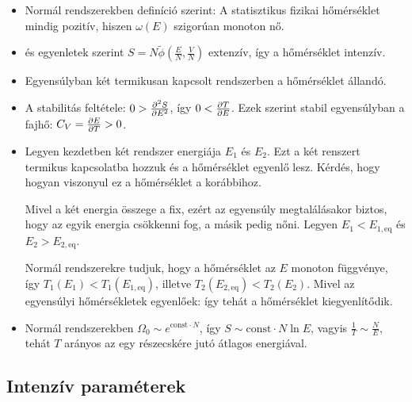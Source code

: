    \begin{itemize}
    \item 
     Normál rendszerekben definíció szerint:
     A statisztikus fizikai hőmérséklet mindig pozitív, hiszen $\omega(E)$ szigorúan monoton nő. 
    
    \item
      és  egyenletek szerint $S=N\tilde{\phi}\left(\frac{E}{N},\frac{V}{N}\right)$ extenzív, így 
     a hőmérséklet intenzív. 
     
    \item
     Egyensúlyban két termikusan kapcsolt rendszerben a hőmérséklet állandó.
    \item 
     A stabilitás feltétele: $0>\frac{\partial ^2S}{\partial E^2}$, így $0<\frac{\partial T}{\partial E}$. Ezek szerint stabil egyensúlyban a fajhő: $C_V=\frac{\partial E}{\partial T}>0$. 
     
    \item 
     
     Legyen kezdetben két rendszer energiája $E_1$ és $E_2$. Ezt a két renszert termikus kapcsolatba hozzuk és a hőmérséklet egyenlő lesz. Kérdés, hogy hogyan viszonyul ez a hőmérséklet a korábbihoz. 
     
     Mivel a két energia összege a fix, ezért az egyensúly megtalálásakor biztos, hogy az egyik energia csökkenni fog, a másik pedig nőni. Legyen $E_1<E_{1,\text{eq}}$ és $E_2>E_{2,\text{eq}}$.
     
     Normál rendszerekre tudjuk, hogy a hőmérséklet az $E$ monoton függvénye, így $T_1(E_1)<T_1(E_{1,\text{eq}})$, illetve $T_2(E_{2,\text{eq}})<T_2(E_2)$. Mivel az egyensúlyi hőmérsékletek egyenlőek: 
     így tehát a hőmérséklet kiegyenlítődik.
     
    \item
     Normál rendszerekben $\Omega_0\sim e^{\text{const}\cdot N}$, így $S\sim\text{const} \cdot N \ln E$, vagyis $\frac{1}{T}\sim\frac{N}{E}$, tehát $T$ arányos az egy részecskére jutó átlagos energiával.
   \end{itemize}
   
  \subsection{Intenzív paraméterek}
   
